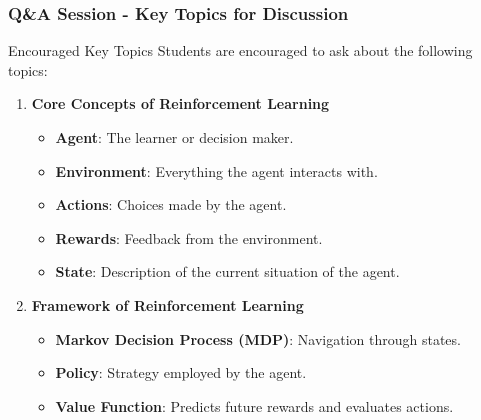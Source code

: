 \documentclass[aspectratio=169]{beamer}
\begin{document}
\begin{frame}[fragile]
    \frametitle{Q\&A Session - Key Topics for Discussion}
    \begin{block}{Encouraged Key Topics}
        Students are encouraged to ask about the following topics:
    \end{block}
    \begin{enumerate}
        \item \textbf{Core Concepts of Reinforcement Learning}
        \begin{itemize}
            \item \textbf{Agent}: The learner or decision maker.
            \item \textbf{Environment}: Everything the agent interacts with.
            \item \textbf{Actions}: Choices made by the agent.
            \item \textbf{Rewards}: Feedback from the environment.
            \item \textbf{State}: Description of the current situation of the agent.
        \end{itemize}

        \item \textbf{Framework of Reinforcement Learning}
        \begin{itemize}
            \item \textbf{Markov Decision Process (MDP)}: Navigation through states.
            \item \textbf{Policy}: Strategy employed by the agent.
            \item \textbf{Value Function}: Predicts future rewards and evaluates actions.
        \end{itemize}
    \end{enumerate}
\end{frame}
\end{document}
